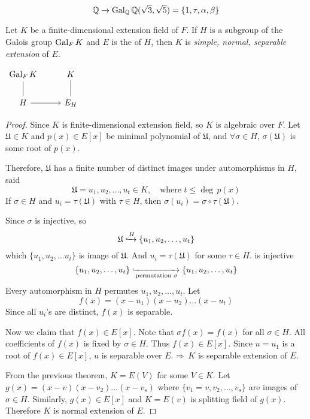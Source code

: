 \begin{example}
    \[
        \mathbb{Q} \rightarrow \operatorname{Gal}_\mathbb{Q} \mathbb{Q}(\sqrt{3}, \sqrt{5}) = \{1, \tau, \alpha, \beta \}
    \]
\end{example}

\begin{lemma}
    Let $K$ be a finite-dimensional extension field of $F$. If $H$ is a subgroup of the Galois group 
    $\operatorname{Gal}_F K$ and $E$ is the  of $H$, then $K$ is 
    \textit{simple, normal, separable extension} of $E$.

    \begin{center}
        $\begin{tikzcd}
            \gal_F K  
            & K \arrow[dash]{d} \\
            H \arrow[dash]{u} \arrow[r]
            & E_H
            \end{tikzcd}
        $
    \end{center}
\end{lemma}
\begin{proof}
    Since $K$ is finite-dimensional extension field, so $K$ is algebraic over $F$. Let $\mathfrak{U} \in K$ and 
    $p(x) \in E[x]$ be minimal polynomial of $\mathfrak{U}$, and $\forall \sigma \in H$, $\sigma(\mathfrak{U})$ is 
    some root of $p(x)$.

    Therefore, $\mathfrak{U}$ has a finite number of distinct images under automorphisms in $H$, said 
    \[
        \mathfrak{U} = u_1, u_2, \ldots, u_t \in K, \quad \text{where } t \leq \deg\, p(x)
    \]
    If $\sigma \in H$ and $u_i = \tau(\mathfrak{U})$ with $\tau \in H$, then $\sigma(u_i) = \sigma \circ \tau (\mathfrak{U})$.

    Since $\sigma$ is injective, so 
    \[
        \mathfrak{U} \xhookrightarrow{H} \{ u_1, u_2, \ldots, u_t \}
    \]
    which $\{ u_1, u_2, \ldots u_t\}$ is image of $\mathfrak{U}$. And $u_i = \tau(\mathfrak{U})$ for some $\tau \in H$.
    is injective 
    \[
        \{ u_1, u_2, \ldots, u_t \} \xhookrightarrow[\text{permutation } \sigma]{} \{ u_1, u_2, \ldots, u_t \}
    \]
    Every automorphism in $H$ permutes $u_1, u_2, \ldots, u_t$. Let 
    \[
        f(x) = (x-u_1)(x-u_2)\ldots(x-u_t)
    \]
    Since all $u_i$'s are distinct, $f(x)$ is separable.

    Now we claim that $f(x) \in E[x]$. Note that $\sigma f(x) = f(x)$ for all $\sigma \in H$. All coefficients of 
    $f(x)$ is fixed by $\sigma \in H$. Thus $f(x) \in E[x]$. Since $u = u_1$ is a root of $f(x) \in E[x]$, $u$ is separable over 
    $E. \Longrightarrow \> K$ is separable extension of $E$.

    From the previous theorem, $K = E(V)$ for some $V \in K$. Let $g(x) = (x - v)(x - v_2) \ldots (x - v_s)$ 
    where $\{ v_1 = v, v_2, \ldots, v_s \}$ are images of $\sigma \in H$. Similarly, $g(x) \in E[x]$ and 
    $K = E(v)$ is splitting field of $g(x)$. Therefore $K$ is normal extension of $E$.
\end{proof}

